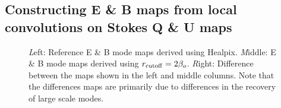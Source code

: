 \subsection{Constructing E \& B maps from local convolutions on Stokes Q \& U maps}

%
\begin{figure}[!h] 
\centering
{}
\caption{{\textit Left:} Reference E \& B mode maps derived using Healpix. {\textit Middle:} E \& B mode maps derived using $r_{\rm cutoff}=2\beta_o$. {\textit Right:} Difference between the maps shown in the left and middle columns. Note that the differences maps are primarily due to differences in the recovery of large scale modes.}
\label{fig:eb-maps-compare}
\end{figure}
%
%
\begin{figure}[!h] 
\centering
{}
\caption{}
\label{fig:eq-spectra_rad_cutoff}
\end{figure}
%

